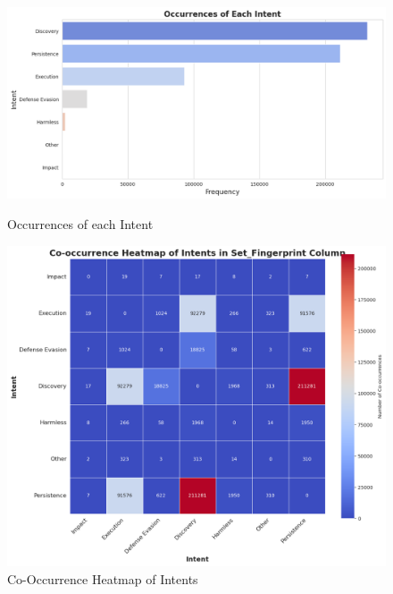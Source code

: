         \begin{figure}[h]
            \centering
            \begin{minipage}[c]{0.47\textwidth}
                \centering
                \vspace{1cm}
                \includegraphics[width=\textwidth]{../figures/plots/section1/occurrences_of_each_intent.png}
                \vspace{0.85cm}
                \caption{Occurrences of each Intent}
                \label{fig:occurrences-of-each-intent}
            \end{minipage}
            \hfill
            \begin{minipage}[c]{0.47\textwidth}
                \centering
                \includegraphics[width=\textwidth]{../figures/plots/section1/co-occurrence_heatmap_of_intents_in_set_fingerprint_column.png}
                \vspace{-0.7cm}
                \caption{Co-Occurrence Heatmap of Intents}
                \label{fig:co-occurrence-heatmap-of-intents}
            \end{minipage}
        \end{figure}

